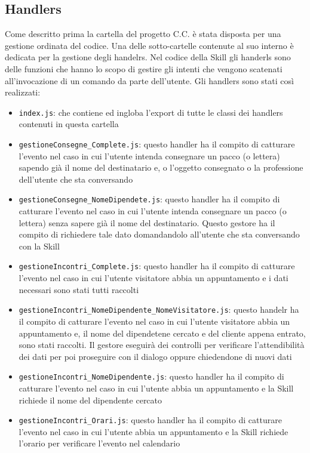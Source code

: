 \subsection{Handlers}
Come descritto prima la cartella del progetto C.C. è stata disposta per una gestione ordinata del codice. Una delle sotto-cartelle contenute al suo interno è dedicata per la gestione degli handelrs. Nel codice della Skill gli handerls sono delle funzioni che hanno lo scopo di gestire gli intenti che vengono scatenati all'invocazione di un comando da parte dell'utente. Gli handlers sono stati così realizzati:
\begin{itemize}
    \item \texttt{index.js}: che contiene ed ingloba l'export di tutte le classi dei handlers contenuti in questa cartella
    
    \item \texttt{gestioneConsegne\_Complete.js}: questo handler ha il compito di catturare l'evento nel caso in cui l'utente intenda consegnare un pacco (o lettera) sapendo già il nome del destinatario e, o l'oggetto consegnato o la professione dell'utente che sta conversando
    \item \texttt{gestioneConsegne\_NomeDipendete.js}: questo handler ha il compito di catturare l'evento nel caso in cui l'utente intenda consegnare un pacco (o lettera) senza sapere già il nome del destinatario. Questo gestore ha il compito di richiedere tale dato domandandolo all'utente che sta conversando con la Skill
    \item \texttt{gestioneIncontri\_Complete.js}: questo handler ha il compito di catturare l'evento nel caso in cui l'utente visitatore abbia un appuntamento e i dati necessari sono stati tutti raccolti
    \item \texttt{gestioneIncontri\_NomeDipendente\_NomeVisitatore.js}: questo handelr ha il compito di catturare l'evento nel caso in cui l'utente visitatore abbia un appuntamento e, il nome del dipendetene cercato e del cliente appena entrato, sono stati raccolti. Il gestore eseguirà dei controlli per verificare l'attendibilità dei dati per poi proseguire con il dialogo oppure chiedendone di nuovi dati
    \item \texttt{gestioneIncontri\_NomeDipendente.js}: questo handler ha il compito di catturare l'evento nel caso in cui l'utente abbia un appuntamento e la Skill richiede il nome del dipendente cercato
    \item \texttt{gestioneIncontri\_Orari.js}: questo handler ha il compito di catturare l'evento nel caso in cui l'utente abbia un appuntamento e la Skill richiede l'orario per verificare l'evento nel calendario

\end{itemize}
